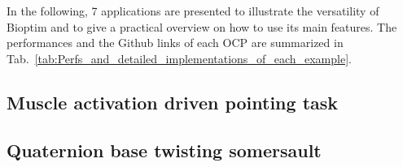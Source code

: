 In the following, 7 applications are presented to illustrate the versatility of Bioptim and to give a practical overview on how to use its main features.
The performances and the Github links of each OCP are summarized in Tab.~\ref{tab:Perfs_and_detailed_implementations_of_each_example}.


\subsection{Muscle activation driven pointing task}


\subsection{Quaternion base twisting somersault}


